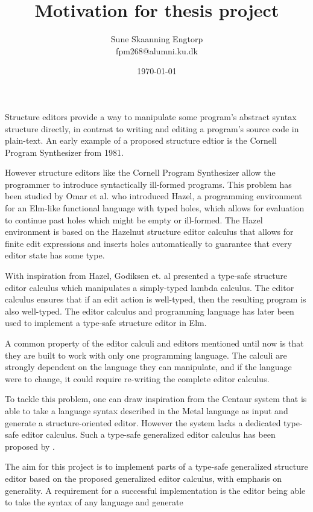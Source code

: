 \documentclass{article}
\title{Motivation for thesis project}
\author{Sune Skaanning Engtorp \\ fpm268@alumni.ku.dk}
\date{\today}
\begin{document}
\maketitle

Structure editors provide a way to manipulate some program's abstract syntax structure directly, in contrast to writing and editing a program's source code in plain-text. An early example of a proposed structure edtior is the Cornell Program Synthesizer\cite{cornell} from 1981.

However structure editors like the Cornell Program Synthesizer\cite{cornell} allow the programmer to introduce syntactically ill-formed programs. This problem has been studied by Omar et al. who introduced Hazel\cite{omar}, a programming environment for an Elm-like functional language with typed holes, which allows for evaluation to continue past holes which might be empty or ill-formed. The Hazel environment is based on the Hazelnut structure editor calculus that allows for finite edit expressions and inserts holes automatically to guarantee that every editor state has some type.

With inspiration from Hazel, Godiksen et. al \cite{godiksen} presented a type-safe structure editor calculus which manipulates a simply-typed lambda calculus. The editor calculus ensures that if an edit action is well-typed, then the resulting program is also well-typed. The editor calculus and programming language has later been used to implement a type-safe structure editor in Elm\cite{PAINT2023-missing ref}.

A common property of the editor calculi and editors mentioned until now is that they are built to work with only one programming language. The calculi are strongly dependent on the language they can manipulate, and if the language were to change, it could require re-writing the complete editor calculus.

To tackle this problem, one can draw inspiration from the Centaur system\cite{centaur} that is able to take a language syntax described in the Metal language as input and generate a structure-oriented editor. However the system lacks a dedicated type-safe editor calculus. Such a type-safe generalized editor calculus has been proposed by \cite{missing ref}.

The aim for this project is to implement parts of a type-safe generalized structure editor based on the proposed generalized editor calculus, with emphasis on generality. A requirement for a successful implementation is the editor being able to take the syntax of any language and generate 


\printbibliography
\end{document}
